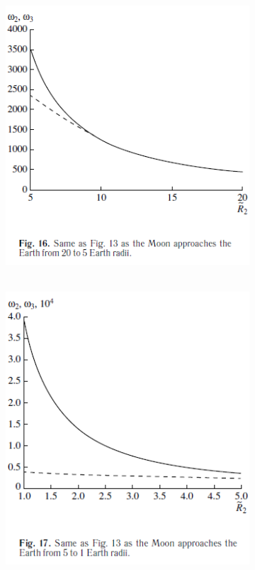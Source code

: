 \documentclass[fontsize = 11pt,a4paper]{article}
\begin{document}
\begin{figure}[b]
  \begin{subfigure}[t]{0.4\linewidth}
    \includegraphics[width=\linewidth]{graph16.png}
  \end{subfigure}
 \begin{subfigure}[b]{0.4\linewidth}
\hbox{\hspace{+9em}
    \includegraphics[width=\linewidth]{graph17.png}
}
  \end{subfigure}
\end{figure}
\end{document}
